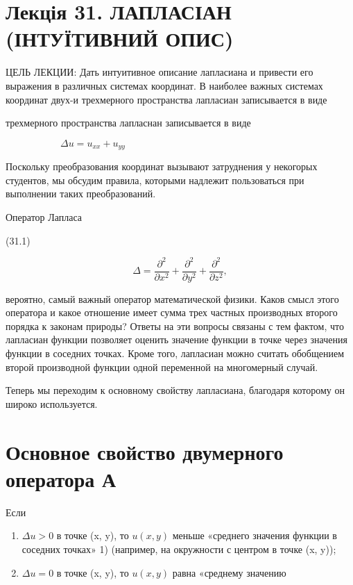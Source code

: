 \documentclass[
  ukrainian,
]{article}
\begin{document}
\section{Лекція 31. ЛАПЛАСІАН (ІНТУЇТИВНИЙ
ОПИС)}\label{ux43bux435ux43aux446ux456ux44f-31.-ux43bux430ux43fux43bux430ux441ux456ux430ux43d-ux456ux43dux442ux443ux457ux442ux438ux432ux43dux438ux439-ux43eux43fux438ux441}

ЦЕЛЬ ЛЕКЦИИ: Дать интуитивное описание лапласиана и привести его
выражения в различных системах координат. В наиболее важных системах
координат двух-и трехмерного пространства лапласиан записывается в виде

трехмерного пространства лапласнан записывается в виде

\[
\Delta u = u_{xx} + u_{yy} \qquad \qquad \qquad \qquad \qquad \qquad \qquad \qquad \qquad
\]

Поскольку преобразования координат вызывают затруднения у некогорых
студентов, мы обсудим правила, которыми надлежит пользоваться при
выполнении таких преобразований.

Оператор Лапласа

(31.1)

\[
\Delta = \frac{\partial^2}{\partial x^2} + \frac{\partial^2}{\partial y^2} + \frac{\partial^2}{\partial z^2},
\]

вероятно, самый важный оператор математической физики. Каков смысл этого
оператора и какое отношение имеет сумма трех частных производных второго
порядка к законам природы? Ответы на эти вопросы связаны с тем фактом,
что лапласиан функции позволяет оценить значение функции в точке через
значения функции в соседних точках. Кроме того, лапласиан можно считать
обобщением второй производной функции одной переменной на многомерный
случай.

Теперь мы переходим к основному свойству лапласиана, благодаря которому
он широко используется.

\section{Основное свойство двумерного оператора
А}\label{ux43eux441ux43dux43eux432ux43dux43eux435-ux441ux432ux43eux439ux441ux442ux432ux43e-ux434ux432ux443ux43cux435ux440ux43dux43eux433ux43e-ux43eux43fux435ux440ux430ux442ux43eux440ux430-ux430}

Если

\begin{enumerate}
\def\labelenumi{\arabic{enumi}.}
\item
  \(\Delta u > 0\) в точке (x, y), то \(u(x, y)\) меньше «среднего
  значения функции в соседних точках» 1) (например, на окружности с
  центром в точке (x, y));
\item
  \(\Delta u = 0\) в точке (x, y), то \(u(x, y)\) равна «среднему
  значению
\end{enumerate}
\end{document}
